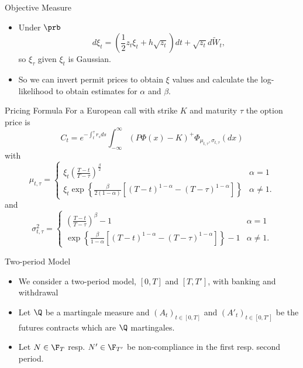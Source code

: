 {Objective Measure}
\begin{itemize}
\item<1->
Under $\prb$
$$
d\xi_t = \left(\frac{1}{2} z_t \xi_t + h \sqrt{z_t} \right)dt + \sqrt{z_t} d\tilde{W}_t,
$$
so $\xi_{\tau}$ given $\xi_t$ is Gaussian.
\item<2-> So we can invert permit prices to obtain $\xi$ values and calculate the log-likelihood to obtain
estimates for $\alpha$ and $\beta$.
\end{itemize}




{Pricing Formula}
For a European call with strike $K$ and maturity $\tau$ the option price is
$$
C_t = e^{-\int_t^\tau r_s ds} \int_{-\infty}^\infty (P\Phi(x)-K)^+ \Phi_{\mu_{t,\tau}, \sigma_{t,\tau}}(dx)
$$
with
$$
\mu_{t,\tau}=
\left\{
\begin{array}{ll}
\xi_t \left(\frac{T-t}{T-\tau}\right)^{\frac{\beta}{2}} & \alpha =1\\
\xi_t \exp\left\{\frac{\beta}{2(1-\alpha)}[(T-t)^{1-\alpha}-(T-\tau)^{1-\alpha}]\right\} & \alpha \not= 1.
\end{array}
\right.
$$
and
$$
\sigma^2_{t,\tau}=
\left\{
\begin{array}{ll}
\left(\frac{T-t}{T-\tau}\right)^\beta-1 & \alpha =1\\
\exp\left\{\frac{\beta}{1-\alpha}[(T-t)^{1-\alpha}-(T-\tau)^{1-\alpha}]\right\}-1 & \alpha \not= 1.
\end{array}
\right.
$$






{Two-period Model}
\begin{itemize}
\item<1-> We consider a two-period model, $[0,T]$ and $[T,T']$, with banking and withdrawal
\item<2-> Let $\Q$ be a martingale measure and $(A_t)_{t\in[0,T]}$ and $(A'_t)_{t\in[0,T']}$
be the futures contracts which are $\Q$ martingales.
\item<3-> Let $N\in \F_T$ resp. $N' \in \F_{T'}$ be non-compliance in the first resp. second period.
\end{itemize}


